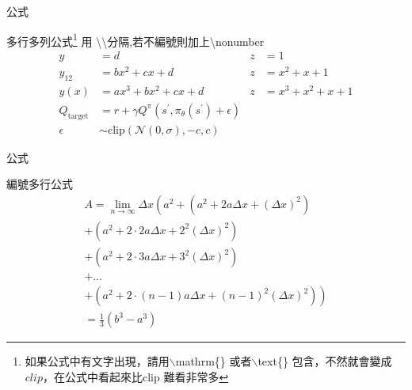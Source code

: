 \documentclass{beamer}
\begin{document}
\begin{frame}{公式}
    \begin{exampleblock}{多行多列公式\footnote{如果公式中有文字出現，請用$\backslash$mathrm\{\} 或者$\backslash$text\{\} 包含，不然就會變成$clip$，在公式中看起來比$\mathrm{clip}$ 難看非常多}}
        用 \textbackslash \textbackslash 分隔,若不編號則加上\textbackslash nonumber
        \begin{align}
            y & =d & z & =1 \\
            y_{12} & =bx^{2}+cx+d & z & =x^{2}+x+1\nonumber \\
            y(x) & =ax^{3}+bx^{2}+cx+d & z & =x^{3}+x^{2}+x+1 \\
            Q_\mathrm{target}&=r+\gamma Q^\pi(s^\prime, \pi_\theta(s^\prime)+\epsilon) \\
            \epsilon&\sim\mathrm{clip}(\mathcal{N}(0, \sigma), -c, c)\nonumber
        \end{align}
    \end{exampleblock}
\end{frame}

\begin{frame}{公式}
    \begin{exampleblock}{編號多行公式}
        \begin{multline}
            A=\lim_{n\rightarrow\infty}\Delta x\left(a^{2}+\left(a^{2}+2a\Delta x+\left(\Delta x\right)^{2}\right)\right.\label{eq:reset}\\
            +\left(a^{2}+2\cdot2a\Delta x+2^{2}\left(\Delta x\right)^{2}\right)\\
            +\left(a^{2}+2\cdot3a\Delta x+3^{2}\left(\Delta x\right)^{2}\right)\\
            +\ldots\\
            \left.+\left(a^{2}+2\cdot(n-1)a\Delta x+(n-1)^{2}\left(\Delta x\right)^{2}\right)\right)\\
            =\frac{1}{3}\left(b^{3}-a^{3}\right)
        \end{multline}
    \end{exampleblock}
\end{frame}
\end{document}
